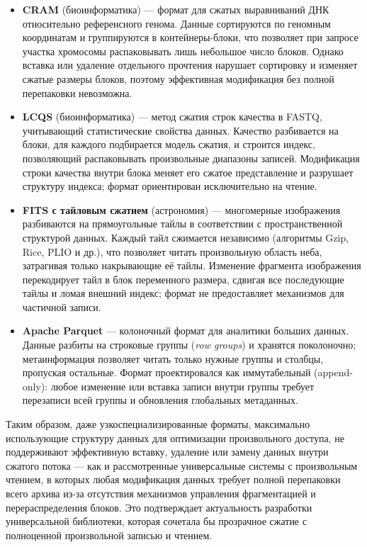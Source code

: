 \begin{itemize}
    \item \textbf{CRAM}\cite{fritz2011cram} (биоинформатика) --- формат для сжатых выравниваний ДНК относительно референсного генома. Данные сортируются по геномным координатам и группируются в контейнеры-блоки, что позволяет при запросе участка хромосомы распаковывать лишь небольшое число блоков. Однако вставка или удаление отдельного прочтения нарушает сортировку и изменяет сжатые размеры блоков, поэтому эффективная модификация без полной перепаковки невозможна.

    \item \textbf{LCQS}\cite{fu2020lcqs} (биоинформатика) --- метод сжатия строк качества в FASTQ, учитывающий статистические свойства данных. Качество разбивается на блоки, для каждого подбирается модель сжатия, и строится индекс, позволяющий распаковывать произвольные диапазоны записей. Модификация строки качества внутри блока меняет его сжатое представление и разрушает структуру индекса; формат ориентирован исключительно на чтение.

    \item \textbf{FITS с тайловым сжатием}\cite{white2012tiledimageconventionstoring} (астрономия) --- многомерные изображения разбиваются на прямоугольные тайлы в соответствии с пространственной структурой данных. Каждый тайл сжимается независимо (алгоритмы Gzip, Rice, PLIO и др.), что позволяет читать произвольную область неба, затрагивая только накрывающие её тайлы. Изменение фрагмента изображения перекодирует тайл в блок переменного размера, сдвигая все последующие тайлы и ломая внешний индекс; формат не предоставляет механизмов для частичной записи.

    \item \textbf{Apache Parquet}\cite{parquet_format} --- колоночный формат для аналитики больших данных. Данные разбиты на строковые группы (\textit{row groups}) и хранятся поколоночно; метаинформация позволяет читать только нужные группы и столбцы, пропуская остальные. Формат проектировался как иммутабельный (append-only): любое изменение или вставка записи внутри группы требует перезаписи всей группы и обновления глобальных метаданных.
\end{itemize}

Таким образом, даже узкоспециализированные форматы, максимально использующие структуру данных для оптимизации произвольного доступа, не поддерживают эффективную вставку, удаление или замену данных внутри сжатого потока --- как и рассмотренные универсальные системы с произвольным чтением, в которых любая модификация данных требует полной перепаковки всего архива из-за отсутствия механизмов управления фрагментацией и перераспределения блоков. Это подтверждает актуальность разработки универсальной библиотеки, которая сочетала бы прозрачное сжатие с полноценной произвольной записью и чтением.
